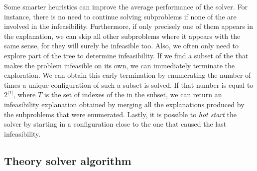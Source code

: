\documentclass[runningheads]{llncs}
\begin{document}
Some smarter heuristics can improve the average performance of the solver.
For instance, there is no need to continue solving subproblems if none of the \nqcs are involved in the infeasibility.
Furthermore, if only precisely one of them appears in the explanation, we can skip all other subproblems where it appears with the same sense, for they will surely be infeasible too.
Also, we often only need to explore part of the tree to determine infeasibility.
If we find a subset of the \nqc that makes the problem infeasible on its own, we can immediately terminate the exploration.
We can obtain this early termination by enumerating the number of times a unique configuration of such a subset is solved.
If that number is equal to $2^{|T|}$, where $T$ is the set of indexes of the \nqcs in the subset, we can return an infeasibility explanation obtained by merging all the explanations produced by the subproblems that were enumerated.
Lastly, it is possible to \textit{hot start} the solver by starting in a configuration close to the one that caused the last infeasibility.


\subsection{Theory solver algorithm}
\end{document}
